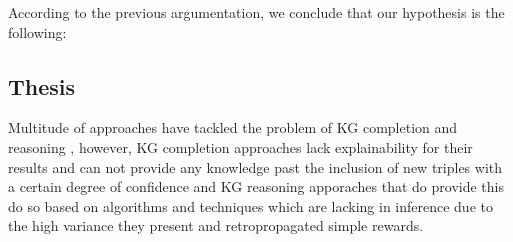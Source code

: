 According to the previous argumentation, we conclude that our hypothesis is the following:



\subsection{Thesis}

Multitude of approaches have tackled the problem of KG completion \cite{} and reasoning \cite{}, however, KG completion approaches lack explainability for their results and can not provide any knowledge past the inclusion of new triples with a certain degree of confidence and KG reasoning apporaches that do provide this do so based on algorithms and techniques which are lacking in inference due to the high variance they present and retropropagated simple rewards.



